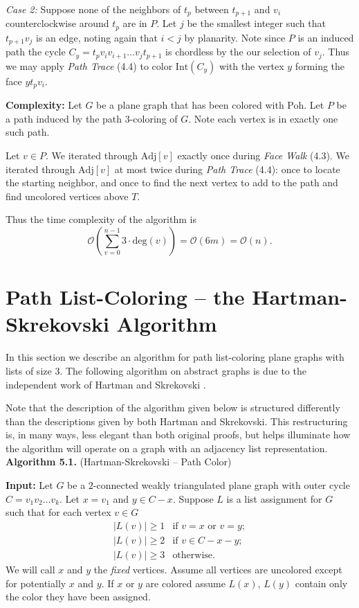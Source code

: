 \documentclass[letterpaper, 12pt]{article}
\theoremstyle{definition}
\theoremstyle{definition}
\theoremstyle{thm}
\theoremstyle{definition}
\begin{document}
\textit{Case 2:} Suppose none of the neighbors of $t_p$ between $t_{p+1}$ and
$v_i$ counterclockwise around $t_p$ are in $P$. Let
$j$ be the smallest integer such that $t_{p+1}v_j$ is an edge, noting again
that $i<j$ by planarity. Note since $P$ is an induced path the cycle
$C_y=t_pv_iv_{i+1}\ldots v_jt_{p+1}$ is chordless by the our selection of $v_j$.
Thus we may apply \textit{Path Trace} (4.4) to color $\text{Int}(C_y)$ with the
vertex $y$ forming the face $yt_pv_i$.

\noindent\textbf{Complexity:} Let $G$ be a plane graph that has been colored
with Poh. Let $P$ be a path induced by the path $3$-coloring of $G$. Note each
vertex is in exactly one such path.

Let $v\in P$. We iterated through $\text{Adj}[v]$ exactly once during
\textit{Face Walk} (4.3). We iterated through $\text{Adj}[v]$ at most twice
during \textit{Path Trace} (4.4): once to locate
the starting neighbor, and once to find the next vertex to add to the path and
find uncolored vertices above $T$.

Thus the time complexity of the algorithm is
\[
    \mathcal{O}\left(\sum_{v=0}^{n-1}3\cdot\text{deg}(v)\right)
    =\mathcal{O}(6m)=\mathcal{O}(n).
\]



\section{Path List-Coloring -- the Hartman-Skrekovski Algorithm}

In this section we describe an algorithm for path
list-coloring plane graphs with lists of size $3$. The following algorithm on
abstract graphs is due to the independent work of Hartman \cite{hartman} and
Skrekovski \cite{skrekovski}.

Note that the description of the algorithm given below is structured differently
than the descriptions given by both Hartman and Skrekovski. This restructuring is, in
many ways, less elegant than both original proofs, but helps illuminate how the
algorithm will operate on a graph with an adjacency list representation.\\

\noindent\textbf{Algorithm 5.1.} (Hartman-Skrekovski -- Path Color)

\noindent\textbf{Input:} Let $G$ be a $2$-connected weakly triangulated plane
graph with outer cycle $C=v_1v_2\ldots v_k$. Let $x=v_1$ and $y\in C-x$.
Suppose $L$ is a list assignment for $G$ such that
for each vertex $v\in G$
\[
    \begin{array}{ll}
	    |L(v)|\ge 1 & \text{if } v=x \text{ or } v=y;\\
	    |L(v)|\ge 2 & \text{if } v\in C-x-y;\\
	    |L(v)|\ge 3 & \text{otherwise.}
    \end{array}
\]
We will call $x$ and $y$ the \textit{fixed} vertices. Assume all vertices are
uncolored except for potentially $x$ and $y$. If $x$ or $y$ are colored assume
$L(x)$, $L(y)$ contain only the color they have been assigned. 
\end{document}
